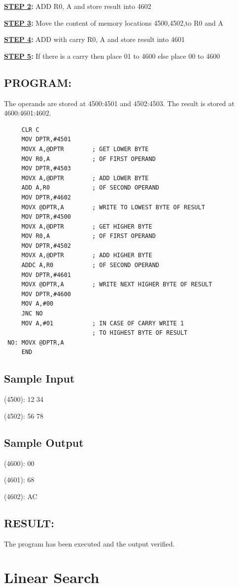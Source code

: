 \documentclass[a4paper,28pt,twoside,openright]{report}
\begin{document}
\textbf{\underline{STEP 2}:} ADD R0, A and store result into 4602 

\textbf{\underline{STEP 3}:} Move the content of memory locations 4500,4502,to R0 and A

\textbf{\underline{STEP 4}:} ADD with carry R0, A and store result into 4601

\textbf{\underline{STEP 5}:} If there is a carry then place 01 to 4600 else place 00 to 4600
\section*{PROGRAM:}
The operands are stored at 4500:4501 and 4502:4503. The result is stored at 4600:4601:4602.
\begin{lstlisting}
     CLR C
     MOV DPTR,#4501
     MOVX A,@DPTR        ; GET LOWER BYTE
     MOV R0,A            ; OF FIRST OPERAND
     MOV DPTR,#4503
     MOVX A,@DPTR        ; ADD LOWER BYTE
     ADD A,R0            ; OF SECOND OPERAND
     MOV DPTR,#4602
     MOVX @DPTR,A        ; WRITE TO LOWEST BYTE OF RESULT
     MOV DPTR,#4500
     MOVX A,@DPTR        ; GET HIGHER BYTE
     MOV R0,A            ; OF FIRST OPERAND
     MOV DPTR,#4502      
     MOVX A,@DPTR        ; ADD HIGHER BYTE
     ADDC A,R0           ; OF SECOND OPERAND
     MOV DPTR,#4601
     MOVX @DPTR,A        ; WRITE NEXT HIGHER BYTE OF RESULT
     MOV DPTR,#4600
     MOV A,#00
     JNC NO
     MOV A,#01           ; IN CASE OF CARRY WRITE 1
                         ; TO HIGHEST BYTE OF RESULT
 NO: MOVX @DPTR,A 
     END
\end{lstlisting}
\section*{Sample Input}
(4500): 12 34

(4502): 56 78
\section*{Sample Output}
(4600): 00

(4601): 68

(4602): AC
\section*{RESULT:}
The program has been executed and the output verified.
%
%
\chapter{Linear Search}
\end{document}
